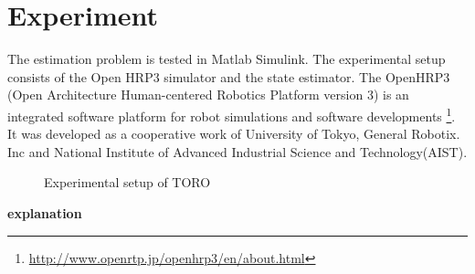 \section{Experiment}
The estimation problem is tested in Matlab Simulink. The experimental setup consists of the Open HRP3 simulator and the state estimator. The OpenHRP3 (Open Architecture Human-centered Robotics Platform version 3) is an integrated software platform for robot simulations and software developments \footnote{\url{http://www.openrtp.jp/openhrp3/en/about.html}}. It was developed as a cooperative work of University of Tokyo, General Robotix. Inc and National Institute of Advanced Industrial Science and Technology(AIST).


\begin{figure}
    
    \caption{Experimental setup of TORO}
\end{figure}

\textbf{explanation}


